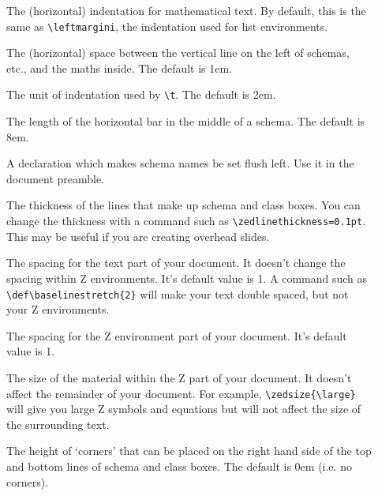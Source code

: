 \documentclass[a4paper]{article}
\begin{document}
\begin{description}
\item[\tt\string\zedindent] The (horizontal) indentation for mathematical text.
        By default, this is the same as \verb|\leftmargini|, the indentation
        used for list environments.
\item[\tt\string\zedleftsep] The (horizontal) space between the vertical line on the left
        of schemas, etc., and the maths inside. The default is 1em.
\item[\tt\string\zedtab] The unit of indentation used by \verb|\t|. The default
        is 2em.
\item[\tt\string\zedbar] The length of the horizontal bar in the middle of a
        schema. The default is 8em.
\item[\tt\string\leftschemas] A declaration which makes schema names be
        set flush left. Use it in the document preamble.
\item[\tt\string\zedlinethickness] The thickness of the lines that make up
        schema and class boxes.  You can change the thickness
        with a command such as \verb|\zedlinethickness=0.1pt|.  This may
        be useful if you are creating overhead slides.
\item[\tt\string\baselinestretch] The spacing for the text part of your
        document.  It doesn't change the spacing within Z environments.  It's
        default value is 1.  A command such as \verb|\def\baselinestretch{2}|
        will make your text double spaced, but not your Z environments.
\item[\tt\string\zedbaselinestretch] The spacing for the Z environment
        part of your document.  It's default value is 1.
\item[\tt\string\zedsize] The size of the material within the Z
        part of your document. It doesn't affect the remainder of your document.
        For example, \verb|\zedsize{\large}| will give you large Z symbols
        and equations but will not affect the size of the surrounding text.
\item[\tt\string\zedcornerheight] The height of `corners' that can be placed
        on the right hand side of the top and bottom lines of schema and class
        boxes.  The default is 0em (i.e. no corners).
\end{description}
\end{document}
